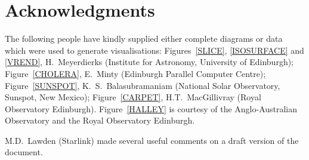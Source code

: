 
\newpage
\section{Acknowledgments  }

The following people have kindly supplied either complete diagrams
or data which were used to generate visualisations: Figures~\ref{SLICE},
\ref{ISOSURFACE} and \ref{VREND}, H.~Meyerdierks (Institute for
Astronomy, University of Edinburgh); Figure~\ref{CHOLERA},
E.~Minty (Edinburgh Parallel Computer Centre); Figure~\ref{SUNSPOT}, 
K.~S.~Balasubramaniam (National Solar Observatory, Sunspot, New Mexico);
Figure~\ref{CARPET}, H.T.~MacGillivray (Royal Observatory Edinburgh). 
Figure~\ref{HALLEY} is courtesy of the Anglo-Australian Observatory and
the Royal Observatory Edinburgh.

M.D.~Lawden (Starlink) made several useful comments on a draft version of
the document.


